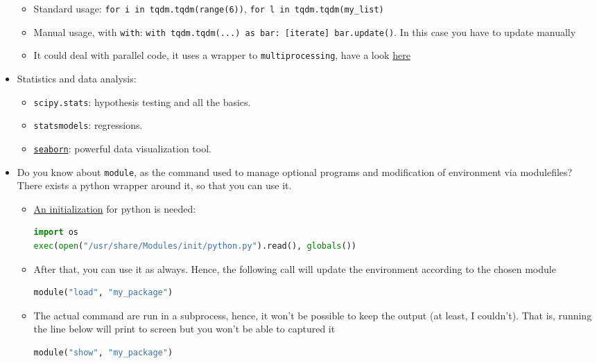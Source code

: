 \documentclass[a4paper,12pt,%
              final%
              ]{article}
\begin{document}
\begin{itemize}
\begin{itemize}
      \item Standard usage: \verb|for i in tqdm.tqdm(range(6))|, \verb|for l in tqdm.tqdm(my_list)|
      \item Manual usage, with \texttt{with}: \verb|with tqdm.tqdm(...) as bar: [iterate] bar.update()|. In this case you have to update manually
      \item It could deal with parallel code, it uses a wrapper to \texttt{multiprocessing}, have a look \href{https://tqdm.github.io/docs/contrib.concurrent/}{here}
    \end{itemize}
  \item Statistics and data analysis:
    \begin{itemize}
      \item \texttt{scipy.stats}: hypothesis testing and all the basics.
      \item \texttt{statsmodels}: regressions.
      \item \href{https://seaborn.pydata.org/introduction.html}{\texttt{seaborn}}: powerful data visualization tool.
    \end{itemize}
  \item Do you know about \texttt{module}, as the command used to manage optional programs and modification of environment via modulefiles?
    There exists a python wrapper around it, so that you can use it.
    \begin{itemize}
      \item \href{https://modules.readthedocs.io/en/latest/module.html#examples-of-initialization}{An initialization} for python is needed:
\begin{lstlisting}[language=python]
import os
exec(open("/usr/share/Modules/init/python.py").read(), globals())
\end{lstlisting}
      \item After that, you can use it as always.
        Hence, the following call will update the environment according to the chosen module
\begin{lstlisting}[language=python]
module("load", "my_package")
\end{lstlisting}
      \item The actual command are run in a subprocess, hence, it won't be possible to keep the output (at least, I couldn't).
        That is, running the line below will print to screen but you won't be able to captured it
\begin{lstlisting}[language=python]
module("show", "my_package")
\end{lstlisting}
    \end{itemize}
\end{itemize}
\end{document}
